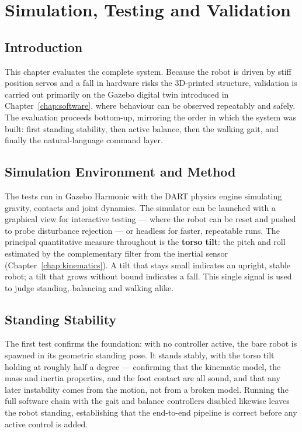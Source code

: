 \chapter{Simulation, Testing and Validation}
\label{chap:validation}

\section{Introduction}
This chapter evaluates the complete system. Because the robot is driven by
stiff position servos and a fall in hardware risks the 3D-printed
structure, validation is carried out primarily on the Gazebo digital twin
introduced in Chapter~\ref{chap:software}, where behaviour can be observed
repeatably and safely. The evaluation proceeds bottom-up, mirroring the
order in which the system was built: first standing stability, then active
balance, then the walking gait, and finally the natural-language command
layer.

\section{Simulation Environment and Method}
The tests run in Gazebo Harmonic with the DART physics engine simulating
gravity, contacts and joint dynamics. The simulator can be launched with a
graphical view for interactive testing --- where the robot can be reset and
pushed to probe disturbance rejection --- or headless for faster, repeatable
runs. The principal quantitative measure throughout is the \textbf{torso
tilt}: the pitch and roll estimated by the complementary filter from the
inertial sensor (Chapter~\ref{chap:kinematics}). A tilt that stays small
indicates an upright, stable robot; a tilt that grows without bound
indicates a fall. This single signal is used to judge standing, balancing
and walking alike.

\section{Standing Stability}
The first test confirms the foundation: with no controller active, the bare
robot is spawned in its geometric standing pose. It stands stably, with the
torso tilt holding at roughly half a degree --- confirming that the
kinematic model, the mass and inertia properties, and the foot contact are
all sound, and that any later instability comes from the motion, not from a
broken model. Running the full software chain with the gait and balance
controllers disabled likewise leaves the robot standing, establishing that
the end-to-end pipeline is correct before any active control is added.

